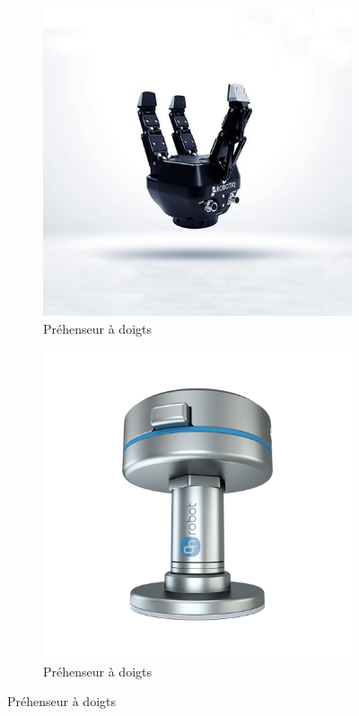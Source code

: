 \begin{figure}[H]
    \begin{subfigure}{0.45\textwidth}
        \includegraphics[width=\textwidth]{assets/figures/Prehenseur_doigts.jpg}
        \caption{Préhenseur à doigts\footnotemark}
        \label{img:prehenseur_a_doigt}
    \end{subfigure}
    \begin{subfigure}{0.45\textwidth}
        \includegraphics[width=\textwidth]{assets/figures/Pince_gecko.png}
        \caption{Préhenseur à doigts\footnotemark}
        \label{img:pince_gecko}
    \end{subfigure}
\end{figure}
